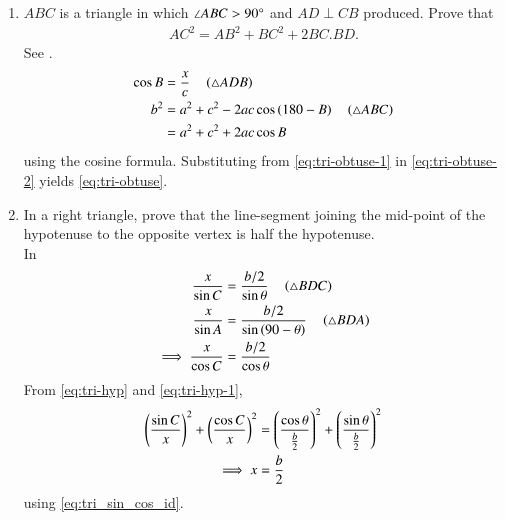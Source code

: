 \begin{enumerate}[label=\thesubsection.\arabic*.,ref=\thesubsection.\theenumi]
\begin{figure}[H]
\end{figure}
%
\item  $ABC$ is a triangle in which  $\angle  ABC > 90\degree$ and $AD  \perp  CB$ produced. Prove that
\begin{align}
	\label{eq:tri-obtuse}
 AC^2= AB^2 + BC^2 + 2 BC . BD.
\end{align}
\solution
	See .	
\begin{align}
	\label{eq:tri-obtuse-1}
	\cos B &= \frac{x}{c} \quad \left(\triangle ADB\right)
	\\
	b^2 &= a^2 + c^2 -2ac \cos \left(180-B\right) \quad \left(\triangle ABC\right)
	\\
	&= a^2 + c^2 +2ac \cos B 
	\label{eq:tri-obtuse-2}
\end{align}
using the cosine formula.
Substituting from 
	\eqref{eq:tri-obtuse-1}
	in
	\eqref{eq:tri-obtuse-2}
	yields 
	\eqref{eq:tri-obtuse}.
\begin{figure}[H]
	\begin{center}
			\resizebox{0.6\columnwidth}{!}{}
	\end{center}
	\caption{}
	\label{fig:tri-obtuse}	
\end{figure}
\item In a right triangle, prove that the line-segment joining the mid-point of the hypotenuse to the opposite vertex is half the hypotenuse.
	\\
	\solution
	In 	
\begin{align}
	\label{eq:tri-hyp}	
	\frac{x}{\sin C} &= \frac{b/2}{\sin \theta} \quad \left(\triangle BDC\right)
	\\
	\frac{x}{\sin A} &= \frac{b/2}{\sin \left(90-\theta\right)} \quad \left(\triangle BDA\right)
	\\
\implies	\frac{x}{\cos C} &= \frac{b/2}{\cos \theta} 
	\label{eq:tri-hyp-1}	
\end{align}
From 
	\eqref{eq:tri-hyp}	
	and
	\eqref{eq:tri-hyp-1},
\begin{align}
	\left(\frac{\sin C}{x}\right)^2
	+
	\left(\frac{\cos C}{x}\right)^2
	&= 
	\left(\frac{\cos \theta}{\frac{b}{2}}\right)^2
	+
	\left(\frac{\sin \theta}{\frac{b}{2}}\right)^2
	\\
	\implies x &= \frac{b}{2} 
\end{align}
using \eqref{eq:tri_sin_cos_id}.
\begin{figure}[H]
	\begin{center}
			\resizebox{0.6\columnwidth}{!}{}
	\end{center}

\end{figure}
\end{enumerate}
